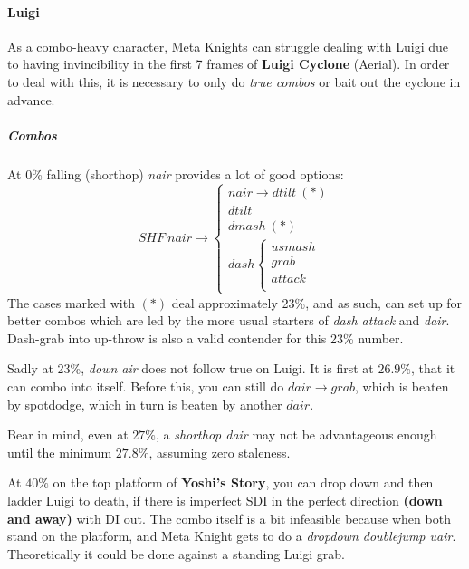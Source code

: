 \paragraph{Luigi}

As a combo-heavy character, Meta Knights can struggle dealing with Luigi due to having invincibility in the first 7 frames of \textbf{Luigi Cyclone} (Aerial). In order to deal with this, it is necessary to only do \textit{true combos} or bait out the cyclone in advance.

\subparagraph{Combos}
At 0\% falling (shorthop) \textit{nair} provides a lot of good options:
\[
	SHF\ nair \to \begin{cases}
	nair \to dtilt \ (*)	\\	
	dtilt	\\
	dmash \ (*)	\\
	dash 
	\begin{cases}
		usmash	\\
		grab	\\
		attack	\\
	\end{cases}
	\end{cases}
\]
The cases marked with $(*)$ deal approximately 23\%, and as such, can set up for better combos which are led by the more usual starters of \textit{dash attack} and \textit{dair}. Dash-grab into up-throw is also a valid contender for this 23\% number. 

Sadly at 23\%, \textit{down air} does not follow true on Luigi. It is first at $26.9\%$, that it can combo into itself. Before this, you can still do $dair \to grab$, which is beaten by spotdodge, which in turn is beaten by another $dair$.

Bear in mind, even at $27\%$, a \textit{shorthop dair} may not be advantageous enough until the minimum $27.8\%$, assuming zero staleness.

At $40\%$ on the top platform of \textbf{Yoshi's Story}, you can drop down and then ladder Luigi to death, if there is imperfect SDI in the perfect direction \textbf{(down and away)} with DI out. The combo itself is a bit infeasible because when both stand on the platform, and Meta Knight gets to do a \textit{dropdown doublejump uair}. Theoretically it could be done against a standing Luigi grab.